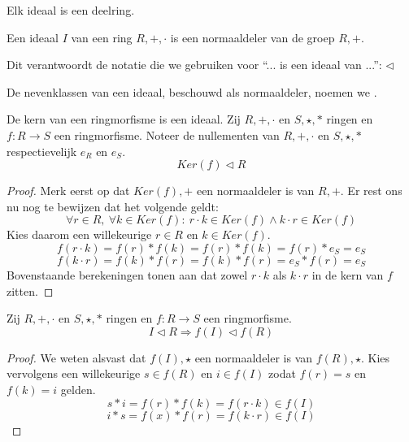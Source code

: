 \documentclass[main.tex]{subfiles}
\begin{document}
\begin{st}
  Elk ideaal is een deelring.
\end{st}

\begin{ei}
  Een ideaal $I$ van een ring $R,+,\cdot$ is een normaaldeler van de groep $R,+$.
\end{ei}

\begin{opm}
  Dit verantwoordt de notatie die we gebruiken voor ``... is een ideaal van ...'': $\triangleleft$
\end{opm}


\begin{de}
  De nevenklassen van een ideaal, beschouwd als normaaldeler, noemen we .
\end{de}


\begin{pr}
  \label{pr:kern-ringmorfisme-is-ideaal}
  De kern van een ringmorfisme is een ideaal.
  Zij $R,+,\cdot$ en $S,\star,*$ ringen en $f: R\rightarrow S$ een ringmorfisme.
  Noteer de nullementen van $R,+,\cdot$ en $S,\star,*$ respectievelijk $e_{R}$ en $e_{S}$.
  \[ Ker(f) \triangleleft R \]

  \begin{proof}
    Merk eerst op dat $Ker(f),+$ een normaaldeler is van $R,+$.
    Er rest ons nu nog te bewijzen dat het volgende geldt:
    \[ \forall r\in R,\ \forall k\in Ker(f):\ r\cdot k \in Ker(f) \wedge k\cdot r \in Ker(f) \]
    Kies daarom een willekeurige $r\in R$ en $k\in Ker(f)$.
    \[ f(r\cdot k) = f(r) * f(k) = f(r) * f(k) = f(r) * e_{S} = e_{S} \]
    \[ f(k\cdot r) = f(k) * f(r) = f(k) * f(r) = e_{S} * f(r) = e_{S} \]
    Bovenstaande berekeningen tonen aan dat zowel $r\cdot k$ als $k\cdot r$ in de kern van $f$ zitten.
  \end{proof}
\end{pr}

\begin{ei}
  \label{ei:ringmorfisme-behoudt-ideaal-zijn}
  Zij $R,+,\cdot$ en $S,\star,*$ ringen en $f: R\rightarrow S$ een ringmorfisme.
  \[ I \triangleleft R \Rightarrow f(I) \triangleleft f(R) \]

  \begin{proof}
    We weten alsvast dat $f(I),\star$ een normaaldeler is van $f(R),\star$.
    Kies vervolgens een willekeurige $s\in f(R)$ en $i\in f(I)$ zodat $f(r) = s$ en $f(k) = i$ gelden.
    \[ s * i = f(r) * f(k) = f(r\cdot k) \in f(I) \]
    \[ i * s = f(x) * f(r) = f(k\cdot r) \in f(I) \]
  \end{proof}
\end{ei}
\end{document}
